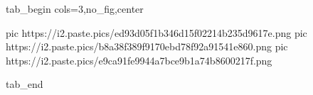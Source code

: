  
 
 
 
 


\ifcmt
  tab_begin cols=3,no_fig,center

     pic https://i2.paste.pics/ed93d05f1b346d15f02214b235d9617e.png
		 pic https://i2.paste.pics/b8a38f389f9170ebd78f92a91541e860.png
		 pic https://i2.paste.pics/e9ca91fe9944a7bce9b1a74b8600217f.png

  tab_end
\fi
